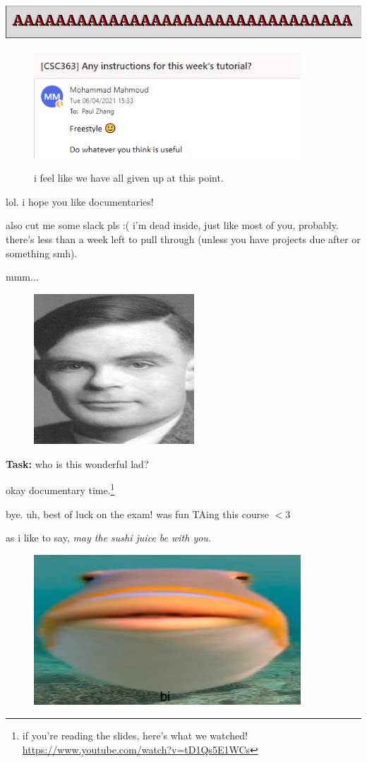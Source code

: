 \documentclass{beamer}
\begin{document}
\begin{frame}{\includegraphics{img/a.png}}
\begin{figure}[h]
\centering
\includegraphics[width=10cm]{img/helpme.png}

i feel like we have all given up at this point.
\end{figure}

lol. i hope you like documentaries!

\vspace{2mm}

{\tiny also cut me some slack pls :( i'm dead inside, just like most of you, probably. there's less than a week left to pull through (unless you have projects due after or something smh). } 
\end{frame}

\begin{frame}{mmm...}
\begin{figure}[h]
\centering
\includegraphics[width=6cm]{img/turing.jpg}
\end{figure}
\textbf{Task:} who is this wonderful lad?

okay documentary time.\footnote{if you're reading the slides, here's what we watched! \url{https://www.youtube.com/watch?v=tD1Qs5E1WCs}}
\end{frame}

\begin{frame}{bye.}
uh, best of luck on the exam! was fun TAing this course $<$3

as i like to say, \textit{may the sushi juice be with you}.

\begin{figure}
\centering
\includegraphics[width=10cm]{img/bye_fish.png}
\end{figure}
\end{frame}
\end{document}
